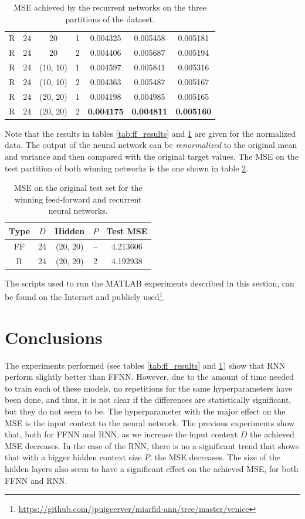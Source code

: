 \documentclass[10pt,a4paper]{article}
\begin{document}
\begin{table}[h]
\begin{tabular}{|c|c|c|c||c|c|c|}
R & 24 & 20 & 1 & 0.004325 & 0.005458 & 0.005181\\
R & 24 & 20 & 2 & 0.004406 & 0.005687 & 0.005194\\
R & 24 & (10, 10) & 1 & 0.004597 & 0.005841 & 0.005316\\
R & 24 & (10, 10) & 2 & 0.004363 & 0.005487 & 0.005167\\
R & 24 & (20, 20) & 1 & 0.004198 & 0.004985 & 0.005165\\
R & 24 & (20, 20) & 2 & \textbf{0.004175} & \textbf{0.004811} & \textbf{0.005160}\\
\hline
\end{tabular}
\caption{MSE achieved by the recurrent networks on the three partitions of the dataset.}
\label{tab:rnn_results}
\end{table}

Note that the results in tables \ref{tab:ff_results} and \ref{tab:rnn_results} are given for the normalized data. The output of the neural network can be \emph{renormalized} to the original mean and variance and then compared with the original target values. The MSE on the test partition of both winning networks is the one shown in table \ref{tab:final_results}.\\

\begin{table}[H]
\centering
\begin{tabular}{|c|c|c|c||c|}
\hline
Type & $D$ & Hidden & $P$ & Test MSE\\
\hline
FF & 24 & (20, 20) & -- & 4.213606\\
R & 24 & (20, 20) & 2 & 4.192938\\
\hline
\end{tabular}
\caption{MSE on the original test set for the winning feed-forward and recurrent neural networks.}
\label{tab:final_results}
\end{table}

The scripts used to run the MATLAB experiments described in this section, can be found on the Internet and publicly used\footnote{\url{https://github.com/jpuigcerver/miarfid-ann/tree/master/venice}}.

\section{Conclusions}
The experiments performed (see tables \ref{tab:ff_results} and \ref{tab:rnn_results}) show that RNN perform slightly better than FFNN. However, due to the amount of time needed to train each of these models, no repetitions for the same hyperparameters have been done, and thus, it is not clear if the differences are statistically significant, but they do not seem to be. The hyperparameter with the major effect on the MSE is the input context to the neural network. The previous experiments show that, both for FFNN and RNN, as we increase the input context $D$ the achieved MSE decreases. In the case of the RNN, there is no a significant trend that shows that with a bigger hidden context size $P$, the MSE decreases. The size of the hidden layers also seem to have a significant effect on the achieved MSE, for both FFNN and RNN.\\
\end{document}
